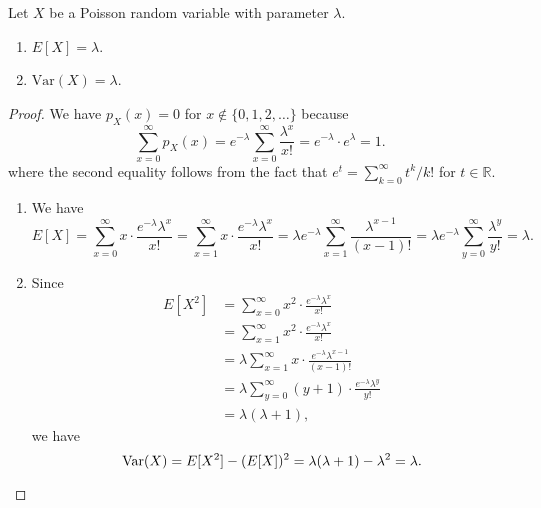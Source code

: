 \begin{theorem}
  Let $X$ be a Poisson random variable with parameter $\lambda$.
  \begin{enumerate}
    \item $E[X] = \lambda$.
    \item $\mathrm{Var}(X) = \lambda$.
  \end{enumerate}
\end{theorem}
\begin{proof}
  We have $p_X(x) = 0$ for $x \notin \{0, 1, 2, \dots\}$ because
  \begin{equation*}
    \sum_{x=0}^\infty p_X(x)
    = e^{-\lambda}\sum_{x=0}^\infty \frac{\lambda^x}{x!}
    = e^{-\lambda} \cdot e^{\lambda}
    = 1.
  \end{equation*}
  where the second equality follows from the fact that
  $e^t = \sum_{k=0}^\infty t^k/k!$ for $t \in \mathbb{R}$.
  \begin{enumerate}
    \item We have
      \begin{equation*}
        E[X]
        = \sum_{x=0}^\infty x \cdot \frac{e^{-\lambda}\lambda^x}{x!}
        = \sum_{x=1}^\infty x \cdot \frac{e^{-\lambda}\lambda^x}{x!}
        = \lambda e^{-\lambda}\sum_{x=1}^\infty \frac{\lambda^{x-1}}{(x-1)!}
        = \lambda e^{-\lambda}\sum_{y=0}^\infty \frac{\lambda^y}{y!}
        = \lambda.
      \end{equation*}
    \item Since
      \begin{align*}
        E[X^2]
        &= \sum_{x=0}^\infty x^2 \cdot \frac{e^{-\lambda}\lambda^x}{x!} \\
        &= \sum_{x=1}^\infty x^2 \cdot \frac{e^{-\lambda}\lambda^x}{x!} \\
        &= \lambda \sum_{x=1}^\infty x \cdot \frac{e^{-\lambda}\lambda^{x-1}}{(x-1)!} \\
        &= \lambda \sum_{y=0}^\infty (y+1) \cdot \frac{e^{-\lambda}\lambda^y}{y!} \\
        &= \lambda(\lambda + 1),
      \end{align*}
      we have
      \begin{equation*}
        \mathrm{Var}(X)
        = E[X^2] - (E[X])^2
        = \lambda(\lambda + 1) - \lambda^2
        = \lambda. \qedhere
      \end{equation*}
  \end{enumerate}
\end{proof}

